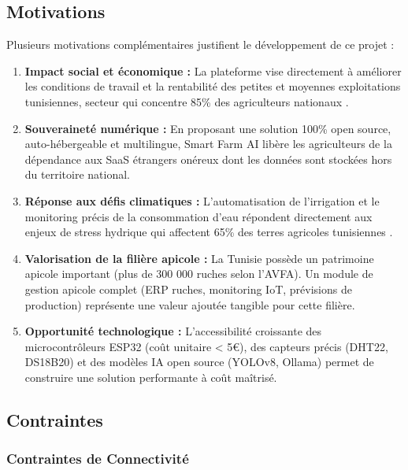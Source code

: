 \documentclass[12pt, a4paper]{report}
\begin{document}
\subsection{Motivations}

Plusieurs motivations complémentaires justifient le développement de ce projet :

\begin{enumerate}[leftmargin=*, label=\textcolor{primary}{\arabic*.}]
    \item \textbf{Impact social et économique :} La plateforme vise directement à améliorer les conditions de travail et la rentabilité des petites et moyennes exploitations tunisiennes, secteur qui concentre 85\% des agriculteurs nationaux \cite{ins2022}.

    \item \textbf{Souveraineté numérique :} En proposant une solution 100\% open source, auto-hébergeable et multilingue, Smart Farm AI libère les agriculteurs de la dépendance aux SaaS étrangers onéreux dont les données sont stockées hors du territoire national.

    \item \textbf{Réponse aux défis climatiques :} L'automatisation de l'irrigation et le monitoring précis de la consommation d'eau répondent directement aux enjeux de stress hydrique qui affectent 65\% des terres agricoles tunisiennes \cite{worldbank2019}.

    \item \textbf{Valorisation de la filière apicole :} La Tunisie possède un patrimoine apicole important (plus de 300 000 ruches selon l'AVFA). Un module de gestion apicole complet (ERP ruches, monitoring IoT, prévisions de production) représente une valeur ajoutée tangible pour cette filière.

    \item \textbf{Opportunité technologique :} L'accessibilité croissante des microcontrôleurs ESP32 (coût unitaire < 5€), des capteurs précis (DHT22, DS18B20) et des modèles IA open source (YOLOv8, Ollama) permet de construire une solution performante à coût maîtrisé.
\end{enumerate}

\subsection{Contraintes}

\subsubsection{Contraintes de Connectivité}
\end{document}
